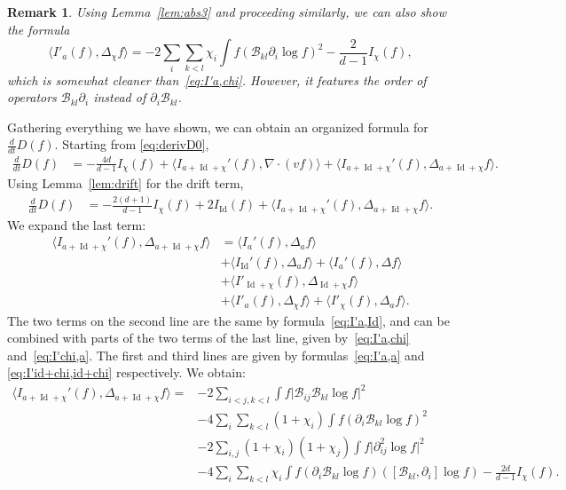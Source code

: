 \documentclass[11pt,a4paper]{article}
\theoremstyle{definition}
\theoremstyle{plain}
\newtheorem{remark}[defi]{Remark}
\DeclareMathOperator*{\Id}{Id}
\newcommand{\jap}[1]{\langle #1 \rangle}
\begin{document}
\begin{remark}
    Using Lemma~\ref{lem:abs3} and proceeding similarly, we can also show the formula
    $$\jap{I'_{a}(f),\Delta_\chi f}=-2\sum_i\!\sum_{k<l}\chi_i \int f(\mathcal{B}_{kl}\partial_i\log f)^2 -\frac{2}{d-1}I_\chi(f),$$
    which is somewhat cleaner than~\eqref{eq:I'a,chi}. However, it features the order of operators $\mathcal{B}_{kl}\partial_i$ instead of $\partial_i\mathcal{B}_{kl}$.
\end{remark}

Gathering everything we have shown, we can obtain an organized formula for $\frac{d}{dt}D(f)$. Starting from \eqref{eq:derivD0},
\begin{align*}
    \frac{d}{dt}D(f)&=-\frac{4d}{d-1}I_\chi(f)+\jap{I_{a+\Id+\chi}'(f),\nabla \cdot (vf)}+\jap{I_{a+\Id+\chi}'(f),\Delta_{a+\Id+\chi}  f}.
\end{align*}
Using Lemma~\ref{lem:drift} for the drift term, 
\begin{align}
\label{eq:derivD1}
    \frac{d}{dt}D(f)
    &=-\frac{2(d+1)}{d-1}I_\chi(f)+2I_{\Id}(f)+\jap{I_{a+\Id+\chi}'(f),\Delta_{a+\Id+\chi}  f}.
\end{align}
We expand the last term:
\begin{align*}
   \jap{I_{a+\Id+\chi}'(f),\Delta_{a+\Id+\chi}  f}  &=\jap{I_{a}'(f),\Delta_a  f}\\
    &+\jap{I_{\Id}'(f),\Delta_a  f}+\jap{I_{a}'(f),\Delta  f}\\
    &+\jap{I'_{\Id+\chi}(f),\Delta_{\Id+\chi} f}\\
    &+\jap{I'_{a}(f),\Delta_{\chi}f}+\jap{I'_{\chi}(f),\Delta_{a} f}.
\end{align*}
The two terms on the second line are the same by formula~\eqref{eq:I'a,Id}, and can be combined with parts of the two terms of the last line, given by~\eqref{eq:I'a,chi} and~\eqref{eq:I'chi,a}. The first and third lines are given by formulas~\eqref{eq:I'a,a} and \eqref{eq:I'id+chi,id+chi} respectively. We obtain:
\begin{align*}
   \jap{I_{a+\Id+\chi}'(f),\Delta_{a+\Id+\chi}  f}=&-2\sum_{i<j,k<l}\int f \vert \mathcal{B}_{ij}\mathcal{B}_{kl}\log f\vert^2\\
   &-4\sum_i\sum_{k<l}(1+\chi_i)\int f (\partial_i\mathcal{B}_{kl} \log f)^2\\
   &-2\sum_{i,j}(1+\chi_i)(1+\chi_j)\int f \vert \partial_{ij}^2 \log f\vert^2\\
   &-4\sum_i\sum_{k<l} \chi_i\int f(\partial_i\mathcal{B}_{kl} \log f)([\mathcal{B}_{kl},\partial_i]\log f)-\frac{2d}{d-1}I_\chi(f).
\end{align*}
\end{document}

